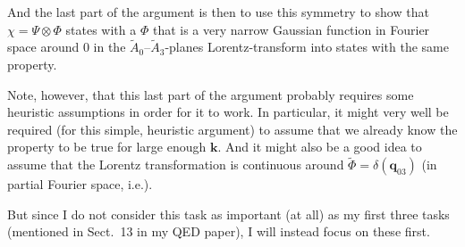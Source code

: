 \documentclass{article}
\begin{document}
And the last part of the argument is then to use this symmetry to show that $\chi = \Psi \otimes \Phi$ states with a $\Phi$ that is a very narrow Gaussian function in Fourier space around 0 in the $\widetilde A_0$--$\widetilde A_3$-planes Lorentz-transform into states with the same property. 

Note, however, that this last part of the argument probably requires some heuristic assumptions in order for it to work. In particular, it might very well be required (for this simple, heuristic argument) to assume that we already know the property to be true for large enough $\mathbf{k}$. And it might also be a good idea to assume that the Lorentz transformation is continuous around $\widetilde \Phi = \delta(\mathbf{q}_{03})$ (in partial Fourier space, i.e.). 

But since I do not consider this task as important (at all) as my first three tasks (mentioned in Sect.\ 13 in my QED paper), I will instead focus on these first. 
\end{document}
